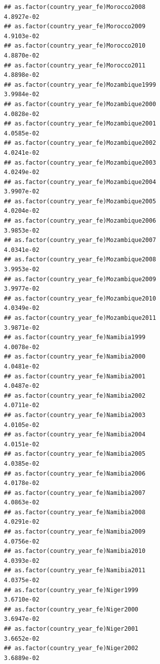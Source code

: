 \documentclass[
  a4paper,
]{article}
\begin{document}
\begin{verbatim}
## as.factor(country_year_fe)Morocco2008                           4.8927e-02
## as.factor(country_year_fe)Morocco2009                           4.9103e-02
## as.factor(country_year_fe)Morocco2010                           4.8870e-02
## as.factor(country_year_fe)Morocco2011                           4.8898e-02
## as.factor(country_year_fe)Mozambique1999                        3.9984e-02
## as.factor(country_year_fe)Mozambique2000                        4.0828e-02
## as.factor(country_year_fe)Mozambique2001                        4.0585e-02
## as.factor(country_year_fe)Mozambique2002                        4.0241e-02
## as.factor(country_year_fe)Mozambique2003                        4.0249e-02
## as.factor(country_year_fe)Mozambique2004                        3.9907e-02
## as.factor(country_year_fe)Mozambique2005                        4.0204e-02
## as.factor(country_year_fe)Mozambique2006                        3.9853e-02
## as.factor(country_year_fe)Mozambique2007                        4.0341e-02
## as.factor(country_year_fe)Mozambique2008                        3.9953e-02
## as.factor(country_year_fe)Mozambique2009                        3.9977e-02
## as.factor(country_year_fe)Mozambique2010                        4.0349e-02
## as.factor(country_year_fe)Mozambique2011                        3.9871e-02
## as.factor(country_year_fe)Namibia1999                           4.0078e-02
## as.factor(country_year_fe)Namibia2000                           4.0481e-02
## as.factor(country_year_fe)Namibia2001                           4.0487e-02
## as.factor(country_year_fe)Namibia2002                           4.0711e-02
## as.factor(country_year_fe)Namibia2003                           4.0105e-02
## as.factor(country_year_fe)Namibia2004                           4.0151e-02
## as.factor(country_year_fe)Namibia2005                           4.0385e-02
## as.factor(country_year_fe)Namibia2006                           4.0178e-02
## as.factor(country_year_fe)Namibia2007                           4.0863e-02
## as.factor(country_year_fe)Namibia2008                           4.0291e-02
## as.factor(country_year_fe)Namibia2009                           4.0756e-02
## as.factor(country_year_fe)Namibia2010                           4.0393e-02
## as.factor(country_year_fe)Namibia2011                           4.0375e-02
## as.factor(country_year_fe)Niger1999                             3.6710e-02
## as.factor(country_year_fe)Niger2000                             3.6947e-02
## as.factor(country_year_fe)Niger2001                             3.6652e-02
## as.factor(country_year_fe)Niger2002                             3.6889e-02

\end{verbatim}
\end{document}
